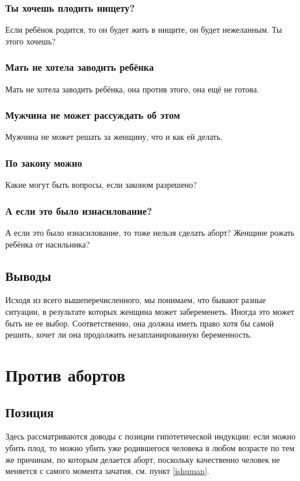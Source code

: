 \documentclass[a4paper,12pt]{report}
\begin{document}
    \section{Ты хочешь плодить нищету?}
        Если ребёнок родится, то он будет жить в нищите, он будет нежеланным. Ты этого хочешь?
    \section{Мать не хотела заводить ребёнка}
        Мать не хотела заводить ребёнка, она против этого, она ещё не готова.
    \section{Мужчина не может рассуждать об этом}
        Мужчина не может решать за женщину, что и как ей делать.   
    \section{По закону можно}
        Какие могут быть вопросы, если законом разрешено?
    \section{А если это было изнасилование?}
        А если это было изнасилование, то тоже нельзя сделать аборт? Женщине рожать ребёнка от насильника?


\chapter{Выводы}
Исходя из всего вышеперечисленного, мы понимаем, что бывают разные ситуации, 
в результате которых женщина может забеременеть. Иногда это может быть не ее 
выбор. Соответственно, она должна иметь право хотя бы самой решить, хочет ли она 
продолжить незапланированную беременность.


\part{Против абортов}
\chapter{Позиция}
Здесь рассматриваются доводы с позиции гипотетической индукции: если можно убить плод, то можно убить 
уже родившегося человека в любом возрасте по тем же причинам, по которым делается аборт,
поскольку качественно человек не меняется с самого момента зачатия, см. пункт \ref{ishuman}.
\end{document}
